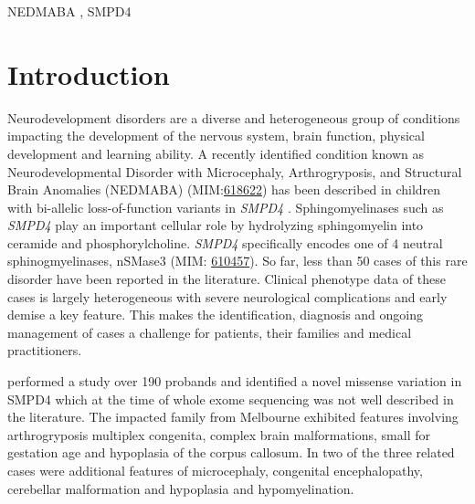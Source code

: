 \documentclass[
  authoryear,
  preprint,
  3p]{elsarticle}
\begin{document}
\begin{frontmatter}
\begin{keyword}
    NEDMABA \sep 
    SMPD4
\end{keyword}
\end{frontmatter}\ifdefined\Shaded\renewenvironment{Shaded}{\begin{tcolorbox}[borderline west={3pt}{0pt}{shadecolor}, interior hidden, sharp corners, enhanced, boxrule=0pt, breakable, frame hidden]}{\end{tcolorbox}}\fi

\hypertarget{introduction}{%
\section{Introduction}\label{introduction}}

Neurodevelopment disorders are a diverse and heterogeneous group of
conditions impacting the development of the nervous system, brain
function, physical development and learning ability. A recently
identified condition known as Neurodevelopmental Disorder with
Microcephaly, Arthrogryposis, and Structural Brain Anomalies (NEDMABA)
(MIM:\href{https://omim.org/entry/618622}{618622}) has been described in
children with bi-allelic loss-of-function variants in \emph{SMPD4}
\citep{magini2019loss}. Sphingomyelinases such as \emph{SMPD4} play an
important cellular role by hydrolyzing sphingomyelin into ceramide and
phosphorylcholine. \emph{SMPD4} specifically encodes one of 4 neutral
sphinogmyelinases, nSMase3 (MIM:
\href{http://omim.org/entry/610457}{610457}). So far, less than 50 cases
of this rare disorder have been reported in the literature. Clinical
phenotype data of these cases is largely heterogeneous with severe
neurological complications and early demise a key feature. This makes
the identification, diagnosis and ongoing management of cases a
challenge for patients, their families and medical practitioners.

\citet{ravenscroft2021neurogenetic} performed a study over 190 probands
and identified a novel missense variation in SMPD4 which at the time of
whole exome sequencing was not well described in the literature. The
impacted family from Melbourne exhibited features involving
arthrogryposis multiplex congenita, complex brain malformations, small
for gestation age and hypoplasia of the corpus callosum. In two of the
three related cases were additional features of microcephaly, congenital
encephalopathy, cerebellar malformation and hypoplasia and
hypomyelination.
\end{document}
